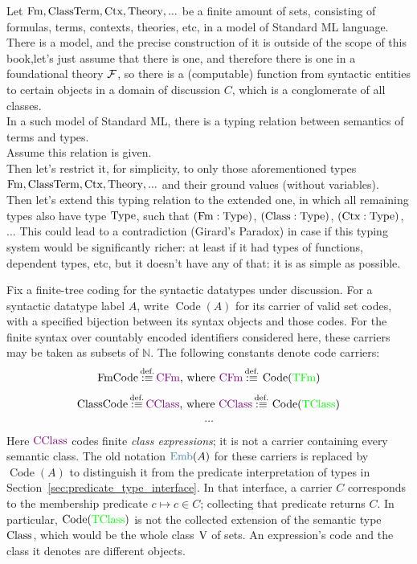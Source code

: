 \begin{definition}
Let $\mathrm{Fm},{\text{ClassTerm}},{\text{Ctx}},{\text{Theory}},...$ be a finite amount of sets, consisting of formulas, terms, contexts, theories, etc, in a model of Standard ML language. There is a model, and the precise construction of it is outside of the scope of this book,let's just assume that there is one, and therefore there is one in a foundational theory ${\mathcal{F}}$, so there is a (computable) function from syntactic entities  to certain objects in a domain of discussion $C$, which is a conglomerate of all classes.\\

In a such model of Standard ML, there is a typing relation between semantics of terms and types.\\
Assume this relation is given.\\
Then let's restrict it, for simplicity, to only those aforementioned types $\mathrm{Fm},{\text{ClassTerm}},{\text{Ctx}},{\text{Theory}},...$ and their ground values (without variables).\\
Then let's extend this typing relation to the extended one, in which all remaining types also have type $\mathrm{Type}$, such that 
$(\mathrm{Fm}:\mathrm{Type})$, $({\text{Class}}:\mathrm{Type})$, $({\text{Ctx}}:\mathrm{Type})$, $\dots$
This could lead to a contradiction (Girard's Paradox) in case if this typing system would be significantly richer: at least if it had types of functions, dependent types, etc, but it doesn't have any of that: it is as simple as possible.
\end{definition}
\fi

\begin{definition}[sets of codes]
Fix a finite-tree coding for the syntactic datatypes under discussion.
For a syntactic datatype label $A$, write $\operatorname{Code}(A)$ for
its carrier of valid set codes, with a specified bijection between its
syntax objects and those codes. For the finite syntax over countably
encoded identifiers considered here, these carriers may be taken as
subsets of $\mathbb N$. The following constants denote code carriers:
\[
\text{FmCode} 
\,{\stackrel{{\textrm{def.}}}{:\equiv}}\,
{\text{\textcolor{violet}{CFm}}}
\text{, where }
{\text{\textcolor{violet}{CFm}}}
\,{\stackrel{{\textrm{def.}}}{:\equiv}}\,
\operatorname{Code}({\text{\textcolor{green}{TFm}}})
\]
\[
\text{ClassCode} 
\,{\stackrel{{\textrm{def.}}}{:\equiv}}\,
{\text{\textcolor{violet}{CClass}}}
\text{, where }
{\text{\textcolor{violet}{CClass}}}
\,{\stackrel{{\textrm{def.}}}{:\equiv}}\,
\operatorname{Code}({\text{\textcolor{green}{TClass}}})
\]
\[
\dots
\]
\end{definition}
Here ${\text{\textcolor{violet}{CClass}}}$ codes finite \emph{class expressions}; it is not a
carrier containing every semantic class. The old notation $\Emb(A)$
for these carriers is replaced by $\operatorname{Code}(A)$ to distinguish
it from the predicate interpretation of types in
Section~\ref{sec:predicate_type_interface}. In that interface, a carrier
$C$ corresponds to the membership predicate $c\mapsto c\in C$;
collecting that predicate returns $C$. In particular,
$\operatorname{Code}({\text{\textcolor{green}{TClass}}})$ is not the collected extension of the
semantic type ${\text{Class}}$, which would be the whole class $\mathrm{V}$ of sets.
An expression's code and the class it denotes are different objects.

